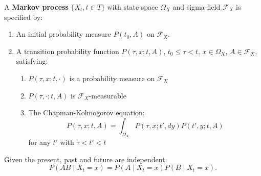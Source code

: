 A \textbf{Markov process} $\{X_t, t \in T\}$ with state space $\Omega_X$ and sigma-field $\mathcal{F}_X$ is specified by:
\begin{enumerate}
\item An initial probability measure $P(t_0, A)$ on $\mathcal{F}_X$.
\item A transition probability function $P(\tau, x; t, A)$, $t_0 \leq \tau < t$, $x \in \Omega_X$, $A \in \mathcal{F}_X$, satisfying:
  \begin{enumerate}
  \item $P(\tau, x; t, \cdot)$ is a probability measure on $\mathcal{F}_X$
  \item $P(\tau, \cdot; t, A)$ is $\mathcal{F}_X$-measurable
  \item The Chapman-Kolmogorov equation:
    $$P(\tau, x; t, A) = \int_{\Omega_X} P(\tau, x; t', dy) P(t', y; t, A)$$
    for any $t'$ with $\tau < t' < t$
  \end{enumerate}
\end{enumerate}

Given the present, past and future are independent:
$$P(AB \mid X_t = x) = P(A \mid X_t = x) P(B \mid X_t = x).$$

